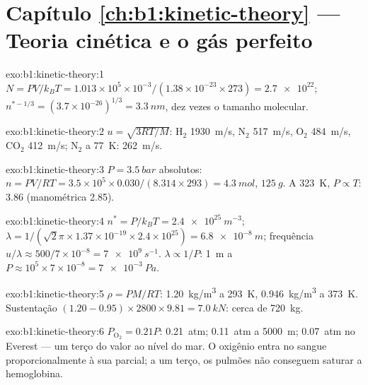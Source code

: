 \section*{Capítulo \ref{ch:b1:kinetic-theory} --- Teoria cinética e o gás perfeito}

\begin{solution}{exo:b1:kinetic-theory:1}
$N = PV/k_BT = 1.013\times10^5 \times 10^{-3}/(1.38\times10^{-23} \times 273) =
\num{2.7e22}$; $n^{*-1/3} = (3.7\times10^{-26})^{1/3} = \qty{3.3}{nm}$, dez
vezes o tamanho molecular.
\end{solution}

\begin{solution}{exo:b1:kinetic-theory:2}
$u = \sqrt{3RT/M}$: H$_2$ \qty{1930}{m/s}, N$_2$ \qty{517}{m/s}, O$_2$
\qty{484}{m/s}, CO$_2$ \qty{412}{m/s}; N$_2$ a \qty{77}{K}: \qty{262}{m/s}.
\end{solution}

\begin{solution}{exo:b1:kinetic-theory:3}
$P = \qty{3.5}{bar}$ absolutos: $n = PV/RT = 3.5\times10^5 \times 0.030/(8.314
\times 293) = \qty{4.3}{mol}$, $\qty{125}{g}$. A \qty{323}{K}, $P \propto T$:
\qty{3.86}{} (manométrica \qty{2.85}{}).
\end{solution}

\begin{solution}{exo:b1:kinetic-theory:4}
$n^* = P/k_BT = \qty{2.4e25}{m^{-3}}$; $\lambda = 1/(\sqrt2\pi \times 1.37\times
10^{-19} \times 2.4\times10^{25}) = \qty{6.8e-8}{m}$; frequência $u/\lambda \approx
500/7\times10^{-8} = \qty{7e9}{s^{-1}}$. $\lambda \propto 1/P$: \qty{1}{m} a
$P \approx 10^5 \times 7\times10^{-8} = \qty{7e-3}{Pa}$.
\end{solution}

\begin{solution}{exo:b1:kinetic-theory:5}
$\rho = PM/RT$: \qty{1.20}{kg/m^3} a \qty{293}{K}, \qty{0.946}{kg/m^3} a
\qty{373}{K}. Sustentação $(1.20 - 0.95) \times 2800 \times 9.81 = \qty{7.0}{kN}$:
cerca de \qty{720}{kg}.
\end{solution}

\begin{solution}{exo:b1:kinetic-theory:6}
$P_{\mathrm{O}_2} = 0.21P$: \qty{0.21}{atm}; \qty{0.11}{atm} a \qty{5000}{m};
\qty{0.07}{atm} no Everest --- um terço do valor ao nível do mar. O oxigênio
entra no sangue proporcionalmente à sua  parcial; a um terço, os
pulmões não conseguem saturar a hemoglobina.
\end{solution}


